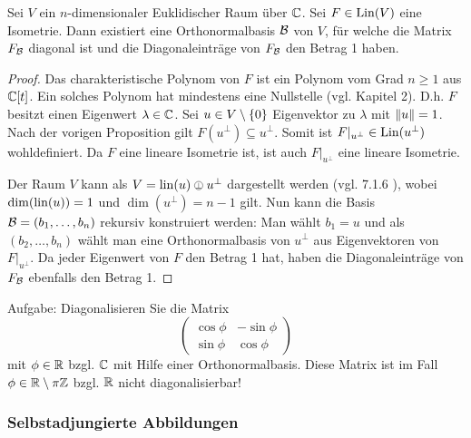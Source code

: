 \begin{thm} 
	Sei $ V $ ein $ n $-dimensionaler Euklidischer Raum über $ \mathbb C $. Sei $ F \in \operatorname{Lin}(V) $ eine Isometrie. Dann existiert eine Orthonormalbasis $ \mathcal{B} $ von $ V $, für welche die Matrix $ F_{\mathcal{B}} $ diagonal ist und die Diagonaleinträge von $ F_{\mathcal{B}} $ den Betrag 1 haben.
\end{thm}
\begin{proof}
	Das charakteristische Polynom von $ F $ ist ein Polynom vom Grad $ n \geq 1 $ aus $ \mathbb C[t] $. Ein solches Polynom hat mindestens eine Nullstelle (vgl. Kapitel 2).
	D.h. $ F $ besitzt einen Eigenwert $ \lambda \in \mathbb C $. Sei $ u \in V \setminus \left\{ 0 \right\} $ Eigenvektor zu $ \lambda $ mit $ \left\| u \right\| = 1 $. Nach der vorigen Proposition gilt $ F(u^\bot) \subseteq u^\bot $. Somit ist $ F|_{u^\bot} \in \operatorname{Lin}(u^\bot) $ wohldefiniert. Da $ F $ eine lineare Isometrie ist, ist auch $ F|_{u^\bot} $ eine lineare Isometrie.
	
	Der Raum $ V $ kann als $ V = \lin(u) \obot u^\bot $ dargestellt werden (vgl. 7.1.6 ), %
	wobei $ \dim(\operatorname{lin}(u)) = 1 $ und $ \dim(u^\bot) = n-1 $ gilt. Nun kann die Basis $ \mathcal{B} = (b_1, \ldots, b_n) $ rekursiv konstruiert werden: Man wählt $ b_1 = u $ und als $ (b_2, \ldots, b_n) $ wählt man eine Orthonormalbasis von $ u^\bot $ aus Eigenvektoren von $ F|_{u^\bot} $. Da jeder Eigenwert von $ F $ den Betrag 1 hat, haben die Diagonaleinträge von $ F_{\mathcal{B}} $ ebenfalls den Betrag 1.
\end{proof}
\begin{bsp}
	Aufgabe: Diagonalisieren Sie die Matrix
	\begin{equation*}
		\begin{pmatrix}
			\cos \phi & - \sin \phi \\
			\sin \phi & \cos \phi
		\end{pmatrix}
	\end{equation*}
	mit $ \phi \in \mathbb R $ bzgl. $ \mathbb C $ mit Hilfe einer Orthonormalbasis. Diese Matrix ist im Fall $ \phi \in \mathbb R \setminus \pi\mathbb Z $ bzgl. $ \mathbb R $ nicht diagonalisierbar!
\end{bsp}

\subsubsection{Selbstadjungierte Abbildungen}


